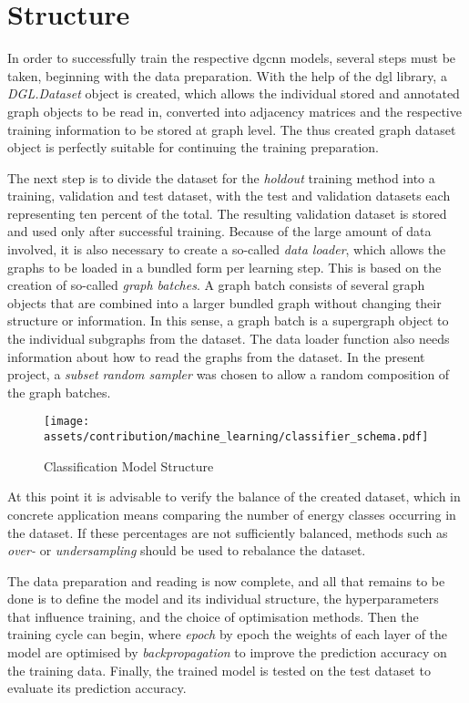 \documentclass[a4paper, 12pt]{report}
\begin{document}
\section{Structure}\label{sec:structure}

In order to successfully train the respective \acrshort{dgcnn} models, several steps must be taken, beginning with the data preparation. With the help of the \acrshort{dgl} library, a \textit{DGL.Dataset} object is created, which allows the individual stored and annotated graph objects to be read in, converted into adjacency matrices and the respective training information to be stored at graph level. The thus created graph dataset object is perfectly suitable for continuing the training preparation.

The next step is to divide the dataset for the \textit{\gls{holdout}} training method into a training, \gls{validation} and test dataset, with the test and \gls{validation} datasets each representing ten percent of the total. The resulting \gls{validation} dataset is stored and used only after successful training. Because of the large amount of data involved, it is also necessary to create a so-called \textit{data loader}, which allows the graphs to be loaded in a bundled form per learning step. This is based on the creation of so-called \textit{graph batches}. A graph batch consists of several graph objects that are combined into a larger bundled graph without changing their structure or information. In this sense, a graph batch is a supergraph object to the individual subgraphs from the dataset. The data loader function also needs information about how to read the graphs from the dataset. In the present project, a \textit{\gls{subset random sampler}} was chosen to allow a random composition of the graph batches.

\begin{figure}
\centering
\texttt{[image: assets/contribution/machine\_learning/classifier\_schema.pdf]}
\caption{Classification Model Structure}
\label{fig:classification-model-layer-size}
\end{figure}

At this point it is advisable to verify the balance of the created dataset, which in concrete application means comparing the number of energy classes occurring in the dataset. If these percentages are not sufficiently balanced, methods such as \textit{over-} or \textit{under\gls{sampling}} should be used to rebalance the dataset.

The data preparation and reading is now complete, and all that remains to be done is to define the model and its individual structure, the hyperparameters that influence training, and the choice of optimisation methods. Then the training cycle can begin, where \textit{\gls{epoch}} by \gls{epoch} the weights of each layer of the model are optimised by \textit{backpropagation} to improve the prediction accuracy on the training data. Finally, the trained model is tested on the test dataset to evaluate its prediction accuracy.
\end{document}

